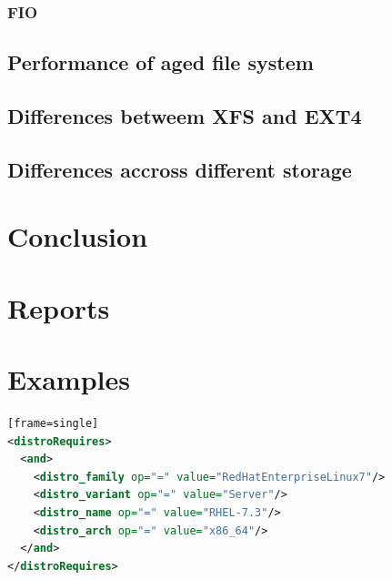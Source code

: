 \documentclass[
  color, %
  table, %
  lof,   %
  lot,   %
]{fithesis3}
\begin{document}
\subsection{FIO}

\section{Performance of aged file system}

\section{Differences betweem XFS and EXT4}


\section{Differences accross different storage}











\chapter{Conclusion}


\printbibliography

\appendix %
\chapter{Reports}
\chapter{Examples}


\begin{lstlisting}[language=xml, caption={Specifying OS to be installed}][frame=single]
<distroRequires>
  <and>
    <distro_family op="=" value="RedHatEnterpriseLinux7"/>
    <distro_variant op="=" value="Server"/>
    <distro_name op="=" value="RHEL-7.3"/>
    <distro_arch op="=" value="x86_64"/>
  </and>
</distroRequires>
\end{lstlisting}
\end{document}

